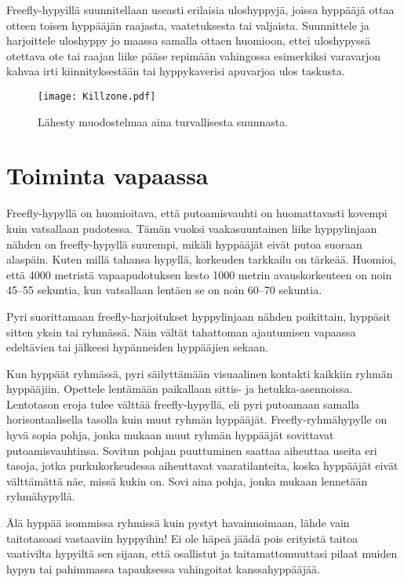 Freefly-hypyillä suunnitellaan useasti erilaisia uloshyppyjä, joissa hyppääjä ottaa otteen toisen hyppääjän raajasta, vaatetuksesta tai valjaista. Suunnittele ja harjoittele uloshyppy jo maassa samalla ottaen huomioon, ettei uloshypyssä otettava ote tai raajan liike pääse repimään vahingossa esimerkiksi varavarjon kahvaa irti kiinnityksestään tai hyppykaverisi apuvarjoa ulos taskusta. 


\begin{figure*}[]\centering\texttt{[image: Killzone.pdf]}\caption{Lähesty muodostelmaa aina turvallisesta suunnasta.}\end{figure*} 

\section{ Toiminta vapaassa }
\label{turvallisuus-freehyppaamisessa-toiminta-vapaassa}


Freefly-hypyllä on huomioitava, että putoamisvauhti on huomattavasti kovempi kuin vatsallaan pudotessa. Tämän vuoksi vaakasuuntainen liike hyppylinjaan nähden on freefly-hypyllä suurempi, mikäli hyppääjät eivät putoa suoraan alaspäin. Kuten millä tahansa hypyllä, korkeuden tarkkailu on tärkeää. Huomioi, että 4000 metristä vapaapudotuksen kesto 1000 metrin avauskorkeuteen on noin 45–55 sekuntia, kun vatsallaan lentäen se on noin 60–70 sekuntia. 


Pyri suorittamaan freefly-harjoitukset hyppylinjaan nähden poikittain, hyppäsit sitten yksin tai ryhmässä. Näin vältät tahattoman ajautumisen vapaassa edeltävien tai jälkeesi hypänneiden hyppääjien sekaan. 


Kun hyppäät ryhmässä, pyri säilyttämään visuaalinen kontakti kaikkiin ryhmän hyppääjiin. Opettele lentämään paikallaan sittis- ja hetukka-asennoissa. Lentotason eroja tulee välttää freefly-hypyllä, eli pyri putoamaan samalla horisontaalisella tasolla kuin muut ryhmän hyppääjät. Freefly-ryhmähypylle on hyvä sopia pohja, jonka mukaan muut ryhmän hyppääjät sovittavat putoamisvauhtinsa. Sovitun pohjan puuttuminen saattaa aiheuttaa useita eri tasoja, jotka purkukorkeudessa aiheuttavat vaaratilanteita, koska hyppääjät eivät välttämättä näe, missä kukin on. Sovi aina pohja, jonka mukaan lennetään ryhmähypyllä. 


Älä hyppää isommissa ryhmissä kuin pystyt havainnoimaan, lähde vain taitotasoasi vastaaviin hyppyihin! Ei ole häpeä jäädä pois erityistä taitoa vaativilta hypyiltä sen sijaan, että osallistut ja taitamattomuuttasi pilaat muiden hypyn tai pahimmassa tapauksessa vahingoitat kanssahyppääjää. 


